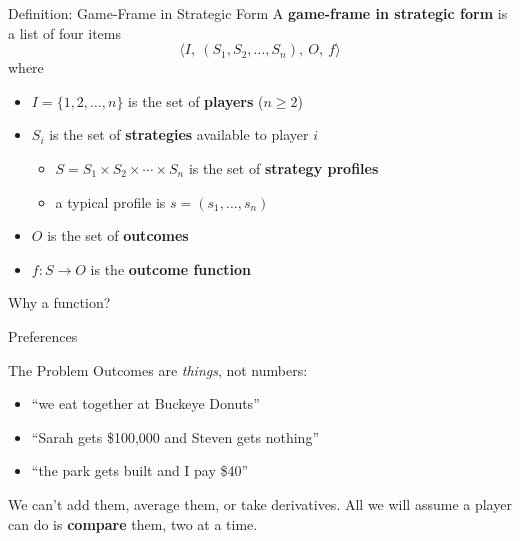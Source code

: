 \begin{frame}{Definition: Game-Frame in Strategic Form}
A \textbf{game-frame in strategic form} is a list of four items
$$\langle I,\ (S_1,S_2,\ldots,S_n),\ O,\ f\rangle$$
where
\begin{itemize}
    \item $I=\{1,2,\ldots,n\}$ is the set of \textbf{players} ($n\ge 2$)
    \item $S_i$ is the set of \textbf{strategies} available to player $i$
    \begin{itemize}
        \item $S=S_1\times S_2\times\cdots\times S_n$ is the set of \textbf{strategy profiles}
        \item a typical profile is $s=(s_1,\ldots,s_n)$
    \end{itemize}
    \item $O$ is the set of \textbf{outcomes}
    \item $f:S\to O$ is the \textbf{outcome function}
\end{itemize}
\vfill
Why a function? \vspace{0.5in}
\end{frame}



\begin{frame}[standout]
Preferences
\end{frame}

\begin{frame}{The Problem}
Outcomes are \textit{things}, not numbers:
\bsk
\begin{itemize}
    \item ``we eat together at Buckeye Donuts''
    \item ``Sarah gets \$100,000 and Steven gets nothing''
    \item ``the park gets built and I pay \$40''
\end{itemize}
\bsk
We can't add them, average them, or take derivatives.
\vfill
All we will assume a player can do is \textbf{compare} them, two at a time.
\vspace{-0.5in}
\end{frame}

